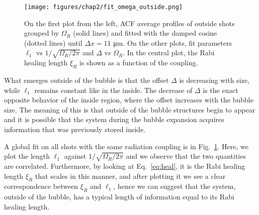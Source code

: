 \begin{figure}[ht!]
    \centering
    \texttt{[image: figures/chap2/fit\_omega\_outside.png]}
    \caption{On the first plot from the left, ACF average profiles of outside shots grouped by $\Omega_R$ (solid lines) and fitted with the damped cosine (dotted lines) until $\Delta x = 11$ \unit{\micro\meter}. On the other plots, fit parameters $\ell_1$ vs $1/\sqrt{\Omega_R/2\pi}$ and $\Delta$ vs $\Omega_R$. In the central plot, the Rabi healing length $\xi_R$ is shown as a function of the coupling.}
    \label{fig:fit_omega_outside}
\end{figure}
What emerges outside of the bubble is that the offset $\Delta$ is decreasing with size, while $\ell_1$ remains constant like in the inside. The decrease of $\Delta$ is the exact opposite behavior of the inside region, where the offset increases with the bubble size. The meaning of this is that outside of the bubble structures begin to appear and it is possible that the system during the bubble expansion acquires information that was previously stored inside.

A global fit on all shots with the same radiation coupling is in Fig.\ \ref{fig:fit_omega_outside}. Here, we plot the length $\ell_1$ against $1/\sqrt{\Omega_R/2\pi}$ and we observe that the two quantities are correlated. Furthermore, by looking at Eq.\ \eqref{eq:heal}, it is the Rabi healing length $\xi_R$ that scales in this manner, and after plotting it we see a clear correspondence between $\xi_R$ and $\ell_1$, hence we can suggest that the system, outside of the bubble, has a typical length of information equal to its Rabi healing length.
